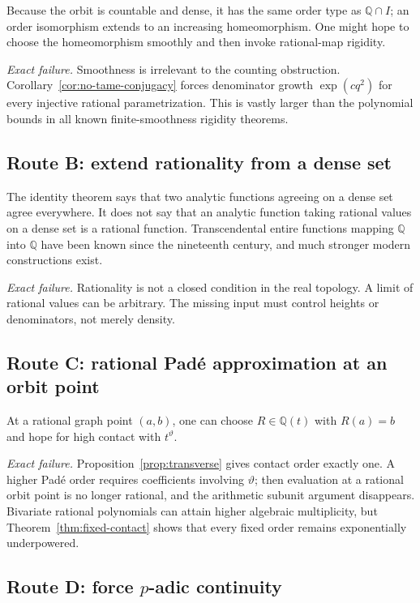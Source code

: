 \documentclass[11pt]{article}
\theoremstyle{definition}
\theoremstyle{remark}
\newcommand{\Q}{\mathbb Q}
\begin{document}
Because the orbit is countable and dense, it has the same order type as $\Q\cap I$; an order
isomorphism extends to an increasing homeomorphism.  One might hope to choose the
homeomorphism smoothly and then invoke rational-map rigidity.

\emph{Exact failure.}  Smoothness is irrelevant to the counting obstruction.
Corollary~\ref{cor:no-tame-conjugacy} forces denominator growth
$\exp(cq^2)$ for every injective rational parametrization.  This is vastly larger than the
polynomial bounds in all known finite-smoothness rigidity theorems.

\subsection{Route B: extend rationality from a dense set}

The identity theorem says that two analytic functions agreeing on a dense set agree
everywhere.  It does not say that an analytic function taking rational values on a dense set
is a rational function.  Transcendental entire functions mapping $\Q$ into $\Q$ have been
known since the nineteenth century, and much stronger modern constructions exist.

\emph{Exact failure.}  Rationality is not a closed condition in the real topology.  A limit
of rational values can be arbitrary.  The missing input must control heights or denominators,
not merely density.

\subsection{Route C: rational Pad\'e approximation at an orbit point}

At a rational graph point $(a,b)$, one can choose $R\in\Q(t)$ with $R(a)=b$ and hope for high
contact with $t^\vartheta$.

\emph{Exact failure.}  Proposition~\ref{prop:transverse} gives contact order exactly one.
A higher Pad\'e order requires coefficients involving $\vartheta$; then evaluation at a
rational orbit point is no longer rational, and the arithmetic subunit argument disappears.
Bivariate rational polynomials can attain higher algebraic multiplicity, but
Theorem~\ref{thm:fixed-contact} shows that every fixed order remains exponentially
underpowered.

\subsection{Route D: force $p$-adic continuity}
\end{document}
